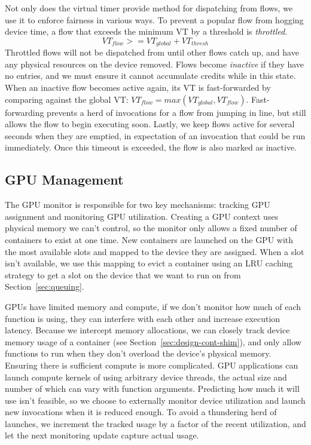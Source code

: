 Not only does the virtual timer provide method for dispatching from flows, we use it to enforce fairness in various ways.
To prevent a popular flow from hogging device time, a flow that exceeds the minimum VT by a threshold is \emph{throttled}.
\begin{equation}
  VT_{flow} >= VT_{global} + VT_{thresh}
\end{equation}
Throttled flows will not be dispatched from until other flows catch up, and have any physical resources on the device removed.
Flows become \emph{inactive} if they have no entries, and we must ensure it cannot accumulate credits while in this state.
When an inactive flow becomes active again, its VT is fast-forwarded by comparing against the global VT: $VT_{flow} = max(VT_{global}, VT_{flow})$.
Fast-forwarding prevents a herd of invocations for a flow from jumping in line, but still allows the flow to begin executing soon.
Lastly, we keep flows active for several seconds when they are emptied, in expectation of an invocation that could be run immediately.
Once this timeout is exceeded, the flow is also marked as inactive.


\subsection{GPU Management}
\label{sec:gpu-man}

The GPU monitor is responsible for two key mechanisms: tracking GPU assignment and monitoring GPU utilization.
Creating a GPU context uses physical memory we can't control, so the monitor only allows a fixed number of containers to exist at one time.
New containers are launched on the GPU with the most available slots and mapped to the device they are assigned.
When a slot isn't available, we use this mapping to evict a container using an LRU caching strategy to get a slot on the device that we want to run on from Section~\ref{sec:queuing}.

GPUs have limited memory and compute, if we don't monitor how much of each function is using, they can interfere with each other and increase execution latency.
Because we intercept memory allocations, we can closely track device memory usage of a container (see Section~\ref{sec:design-cont-shim}), and only allow functions to run when they don't overload the device's physical memory.
Ensuring there is sufficient compute is more complicated.
GPU applications can launch compute kernels of using arbitrary device threads, the actual size and number of which can vary with function arguments.
Predicting how much it will use isn't feasible, so we choose to externally monitor device utilization and launch new invocations when it is reduced enough.
To avoid a thundering herd of launches, we increment the tracked usage by a factor of the recent utilization, and let the next monitoring update capture actual usage.

